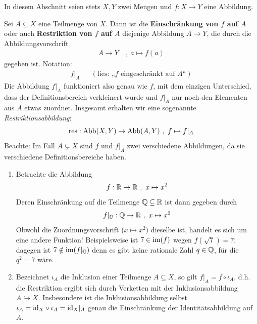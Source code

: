 In diesem Abschnitt seien stets $X,Y$ zwei Mengen und $f:X\to Y$ eine Abbildung.


\begin{defin} \label{def:quelleschrank} 
    Sei $A \subseteq X$ eine Teilmenge von $X$. Dann ist die \textbf{Einschränkung von $f$ auf $A$} oder auch \textbf{Restriktion von $f$ auf $A$} diejenige Abbildung $A\to Y$, die durch die Abbildungsvorschrift
    \begin{align*}
        A \to Y \ &,\ a \mapsto f(a)
    \end{align*}
    gegeben ist. Notation:
    \begin{align*}
        f\vert_A && (\text{lies: „$f$ eingeschränkt auf $A$“})
    \end{align*}
    Die Abbildung $f\vert_{A}$ funktioniert also genau wie $f$, mit dem einzigen Unterschied, dass der Definitionsbereich verkleinert wurde und $f\vert_{A}$ nur noch den Elementen aus $A$ etwas zuordnet. Insgesamt erhalten wir eine sogenannte \emph{Restriktionsabbildung}:
        \[ \operatorname{res} : \operatorname{Abb}(X,Y) \to \operatorname{Abb}(A,Y) \ ,\ f \mapsto f\vert_A \]
    Beachte: Im Fall $A\subsetneq X$ sind $f$ und $f\vert_A$ zwei verschiedene Abbildungen, da sie verschiedene Definitionsbereiche haben.
\end{defin}


\begin{bsp} \label{bsp:quelleschrank} \quad
    \begin{enumerate}
    \item Betrachte die Abbildung
        \[ f : \mathbb R \to \mathbb R \ ,\ x \mapsto x^2 \]
    Deren Einschränkung auf die Teilmenge $\mathbb Q\subseteq \mathbb R$ ist dann gegeben durch
        \[ f\vert_{\mathbb Q} : \mathbb Q \to \mathbb R \ ,\ x\mapsto x^2 \]
    Obwohl die Zuordnungsvorschrift ($x\mapsto x^2)$ dieselbe ist, handelt es sich um eine andere Funktion! Beispielsweise ist $7\in \operatorname{im}(f)$ wegen $f(\sqrt{7})=7$; dagegen ist $7\notin \operatorname{im}(f\vert_\mathbb Q)$ denn es gibt keine rationale Zahl $q\in \mathbb Q$, für die $q^2=7$ wäre.
    \item Bezeichnet $\iota_A$ die Inklusion einer Teilmenge $A\subseteq X$, so gilt $f\vert_A = f\circ\iota_A$, d.h. die Restriktion ergibt sich durch Verketten mit der Inklusionsabbildung $A\hookrightarrow X$. Insbesondere ist die Inklusionsabbildung selbst $\iota_A = \mathrm{id}_X\circ \iota_A = \mathrm{id}_X \vert_A$ genau die Einschränkung der Identitätsabbildung auf $A$.
    \end{enumerate}
\end{bsp}
 
